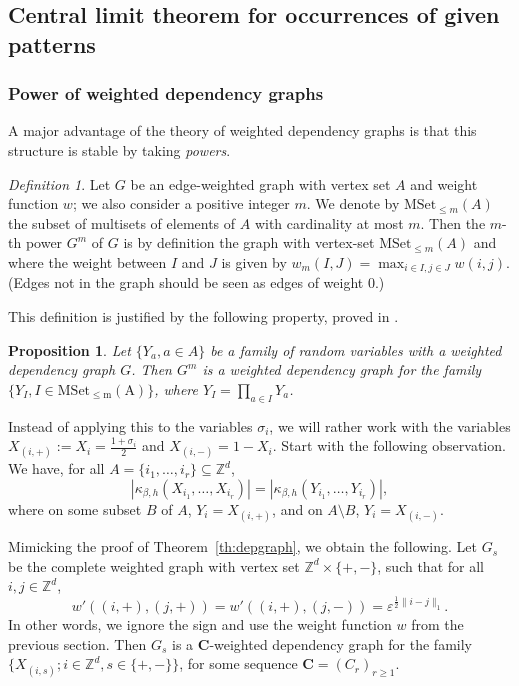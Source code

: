 \documentclass{amsart}
\newcommand{\field}[1]{\mathbb{#1}}
\newcommand{\Z}{\field{Z}}
\def\WDep{G}
\def\eps{\varepsilon}
\newcommand{\dist}[2]{\|#1 - #2\|_1}
\numberwithin{equation}{section}
\newtheorem{proposition}[theorem]{Proposition}
\theoremstyle{remark}
\newtheorem{definition}[theorem]{Definition}
\begin{document}
\subsection{Central limit theorem for occurrences of given patterns}

\label{sec:wdgconfig}
\subsubsection{Power of weighted dependency graphs}
A major advantage of the theory of weighted dependency graphs
is that this structure is stable by taking {\em powers}.
\begin{definition}
  Let $\WDep$ be an edge-weighted graph with vertex set $A$ and weight function $w$;
  we also consider a positive integer $m$.
  We denote by $\mathrm{MSet}_{\leq m}(A)$ the subset of multisets of elements of $A$ with cardinality at most $m$.
  Then the $m$-th power $\WDep^m$ of $\WDep$ is by definition the graph with
  vertex-set $\mathrm{MSet}_{\leq m}(A)$ and where the weight between $I$ and $J$ is given by
  $w_m(I,J)=\max_{i \in I,j \in J} w(i,j)$.
(Edges not in the graph should be seen as edges of weight $0$.)
\end{definition}
This definition is justified by the following property, proved in \cite[Section 5.3]{Valentin}.
\begin{proposition}\label{Prop:powers}
  Let $\{Y_a, a \in A\}$ be a family of random variables with a weighted dependency graph $\WDep$.
  Then $\WDep^m$ is a weighted dependency graph for the family 
  $\{Y_I, I \in \mathrm{MSet_{\leq m}(A)}\}$, where $Y_I = \prod_{a \in I} Y_a$.
\end{proposition}

Instead of applying this to the variables $\sigma_i$,
we will rather work with the variables $X_{(i,+)}:=X_i=\tfrac{1+\sigma_i}{2}$ and $X_{(i,-)}=1-X_i$. 
Start with the following observation. We have, for all $A = \{i_1, \dots, i_r\} \subseteq \Z^d$,
$$\left| \kappa_{\beta,h} (X_{i_1}, \dots, X_{i_r}) \right| = \left| \kappa_{\beta,h} (Y_{i_1}, \dots, Y_{i_r}) \right|,$$
where on some subset $B$ of $A$, $Y_i = X_{(i,+)}$, and on $A \setminus B$, $Y_i = X_{(i,-)}.$



Mimicking the proof of Theorem~\ref{th:depgraph}, we obtain the following.
Let $\WDep_s$ be the complete weighted graph with vertex set $\Z^d \times \{+,-\}$, such that for all $i,j \in \Z^d$,
\[
w'((i,+),(j,+))=w'((i,+),(j,-))= \eps^{\frac12 \dist{i}{j}}.
\]
In other words, we ignore the sign and use the weight function $w$ from the previous section.
Then $\WDep_s$ is a $\mathbf{C}$-weighted dependency graph for the family 
$\{X_{(i,s)}; i \in \Z^d, s \in \{+,-\} \}$, for some sequence  $\mathbf{C} = (C_r)_{r \geq 1}$.
\end{document}

